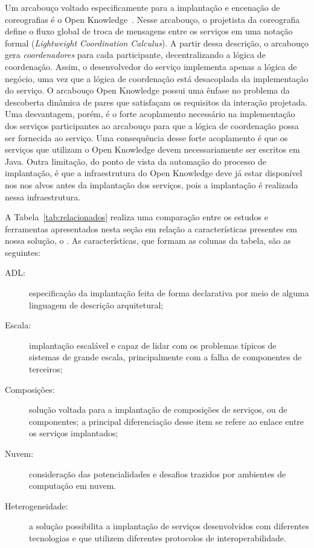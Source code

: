 Um arcabouço voltado especificamente para a implantação e encenação
de coreografias é o Open Knowledge~\cite{Besana2008OpenKnowledge,Siebes2007OK}.
Nesse arcabouço, o projetista da coreografia define o fluxo global
de troca de mensagens entre os serviços em uma notação formal
(\emph{Lightweight Coordination Calculus}).
A partir dessa descrição, o arcabouço gera \emph{coordenadores}
para cada participante, decentralizando a lógica de coordenação.
Assim, o desenvolvedor do serviço implementa apenas a lógica de negócio,
uma vez que a lógica de coordenação está desacoplada da implementação do serviço.
O arcabouço Open Knowledge possui uma ênfase no problema
da descoberta dinâmica de pares que satisfaçam os requisitos
da interação projetada. Uma desvantagem, porém,
é o forte acoplamento necessário na implementação dos serviços participantes
ao arcabouço para que a lógica de coordenação possa ser fornecida ao serviço.
Uma consequência desse forte acoplamento é que os serviços que
utilizam o Open Knowledge devem necessariamente ser escritos em Java.
Outra limitação, do ponto de vista da automação do processo de implantação,
é que a infraestrutura do Open Knowledge deve já estar disponível nos nos alvos
antes da implantação dos serviços, pois a implantação é realizada nessa infraestrutura.

A Tabela~\ref{tab:relacionados} realiza uma comparação entre os estudos e ferramentas apresentados nesta seção em relação a características presentes em nossa solução, o \ee. 
As características, que formam as colunas da tabela, são as seguintes:

\begin{description}
\item [ADL:] especificação da implantação feita de forma declarativa por meio de alguma linguagem de descrição arquitetural;
\item [Escala:] implantação escalável e capaz de lidar com os problemas típicos de sistemas de grande escala, principalmente com a falha de componentes de terceiros;
\item [Composições:] solução voltada para a implantação de composições de serviços, ou de componentes; a principal diferenciação desse item se refere ao enlace entre os serviços implantados;
\item [Nuvem:] consideração das potencialidades e desafios trazidos por ambientes de computação em nuvem.
\item [Heterogeneidade:] a solução possibilita a implantação de serviços desenvolvidos com diferentes tecnologias e que utilizem diferentes protocolos de interoperabilidade.
\end{description}

